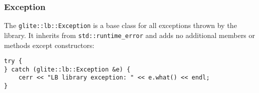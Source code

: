 \subsubsection{Exception}
The \verb'glite::lb::Exception' is a base class for all exceptions
thrown by the \LB library. It inherits from \verb'std::runtime_error'
and adds no additional members or methods except constructors:
\begin{lstlisting}
try {
} catch (glite::lb::Exception &e) {
	cerr << "LB library exception: " << e.what() << endl;
}
\end{lstlisting}
